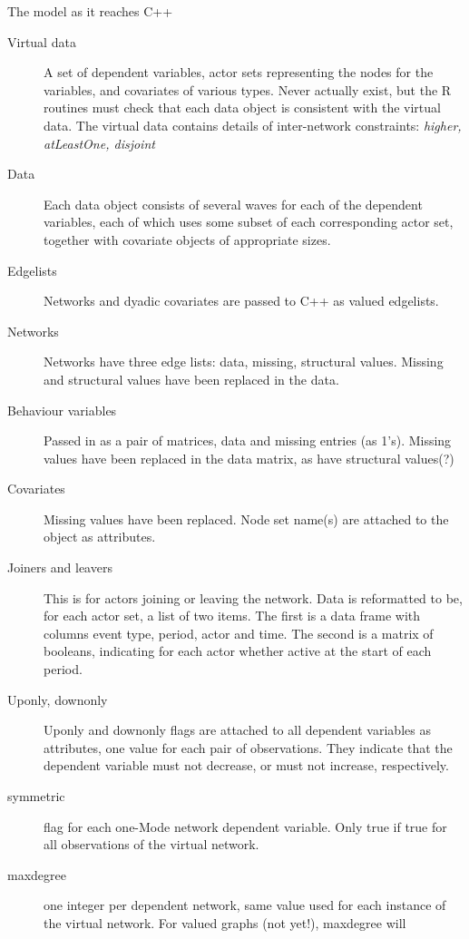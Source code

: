 \documentclass[12pt,a4paper]{article}
\makeatletter
\renewcommand{\=}{\,=\,}
\newcommand{\+}{\,+\,}
\newcommand{\nnm}[1]{\textsf{\small\textit{#1}}}
\newcommand{\R}{{\sf R }}
\renewcommand{\subsection}{\@startsection{subsection}{2}
                {0pt}{0.7\baselineskip}{0.3\baselineskip}
                {\sffamily} }
\makeatother
\begin{document}
\subsection{The model as it reaches C++}

\begin{description}
\item [Virtual data] A set of dependent variables, actor sets representing the
  nodes for the variables, and covariates of various types. Never actually
  exist, but the \R routines must check that each data object is consistent with
  the virtual data. The virtual data contains details of inter-network
  constraints: \nnm{higher, atLeastOne, disjoint}
\item[Data] Each data object consists of several waves for each of the dependent
  variables, each of which uses some subset of each corresponding actor set,
  together with covariate objects of appropriate sizes.
\item[Edgelists] Networks and dyadic covariates are passed to C++ as valued
  edgelists.
\item [Networks] Networks have three edge lists: data, missing, structural
  values. Missing and structural values have been replaced in the data.
\item[Behaviour variables] Passed in as a pair of matrices, data and missing
  entries (as 1's). Missing values have been replaced in the data matrix, as
  have structural values(?)
\item [Covariates] Missing values have been replaced. Node set name(s) are
  attached to the object as attributes.
\item[Joiners and leavers] This is for actors joining or leaving the network.
  Data is reformatted to be, for each actor set, a list
  of two items. The first is a data frame with columns event type, period, actor
  and time. The second is a matrix of booleans, indicating for each actor
  whether active at the start of each period.
\item[Uponly, downonly] Uponly and downonly flags are attached to all dependent
  variables as attributes, one value for each pair of observations.
  They indicate that the dependent variable must not decrease, or must not
  increase, respectively.
\item[symmetric] flag for each one-Mode network dependent variable. Only true if
  true for all observations of the virtual network.
\item[maxdegree] one integer per dependent network, same value used for each
  instance of the virtual network.  For valued graphs (not yet!), maxdegree will

\end{description}
\end{document}

